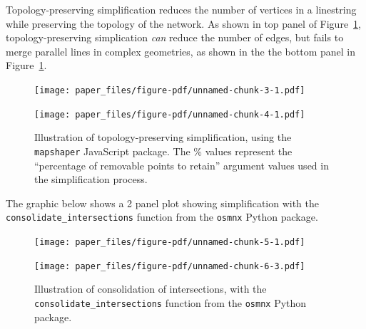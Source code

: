 \documentclass[
  letterpaper,
  DIV=11,
  numbers=noendperiod]{scrartcl}
\begin{document}
Topology-preserving simplification reduces the number of vertices in a
linestring while preserving the topology of the network. As shown in top
panel of Figure~\ref{fig-topology-preserving}, topology-preserving
simplication \emph{can} reduce the number of edges, but fails to merge
parallel lines in complex geometries, as shown in the the bottom panel
in Figure~\ref{fig-topology-preserving}.

\begin{figure}

\begin{minipage}[t]{\linewidth}

{\centering 

\texttt{[image: paper\_files/figure-pdf/unnamed-chunk-3-1.pdf]}

}

\end{minipage}%
\newline
\begin{minipage}[t]{\linewidth}

{\centering 

\texttt{[image: paper\_files/figure-pdf/unnamed-chunk-4-1.pdf]}

}

\end{minipage}%

\caption{\label{fig-topology-preserving}Illustration of
topology-preserving simplification, using the \texttt{mapshaper}
JavaScript package. The \% values represent the ``percentage of
removable points to retain'' argument values used in the simplification
process.}

\end{figure}

The graphic below shows a 2 panel plot showing simplification with the
\texttt{consolidate\_intersections} function from the \texttt{osmnx}
Python package.

\begin{figure}

\begin{minipage}[t]{0.50\linewidth}

{\centering 

\texttt{[image: paper\_files/figure-pdf/unnamed-chunk-5-1.pdf]}

}

\end{minipage}%
%
\begin{minipage}[t]{0.50\linewidth}

{\centering 

\texttt{[image: paper\_files/figure-pdf/unnamed-chunk-6-3.pdf]}

}

\end{minipage}%

\caption{\label{fig-osmnx-consolidate-intersections}Illustration of
consolidation of intersections, with the
\texttt{consolidate\_intersections} function from the \texttt{osmnx}
Python package.}

\end{figure}
\end{document}
